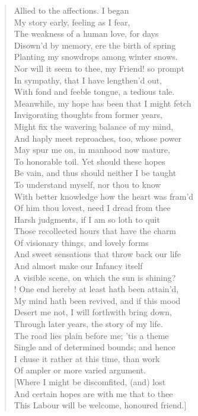 \begin{verse}
Allied to the affections. I began	  \\
My story early, feeling as I fear,  \\
The weakness of a human love, for days  \\
Disown'd by memory, ere the birth of spring  \\
Planting my snowdrops among winter snows.  \\
Nor will it seem to thee, my Friend! so prompt	  \\
In sympathy, that I have lengthen'd out,  \\
With fond and feeble tongue, a tedious tale.  \\
Meanwhile, my hope has been that I might fetch  \\
Invigorating thoughts from former years,  \\
Might fix the wavering balance of my mind,	  \\
And haply meet reproaches, too, whose power  \\
May spur me on, in manhood now mature,  \\
To honorable toil. Yet should these hopes  \\
Be vain, and thus should neither I be taught  \\
To understand myself, nor thou to know	  \\
With better knowledge how the heart was fram'd  \\
Of him thou lovest, need I dread from thee  \\
Harsh judgments, if I am so loth to quit  \\
Those recollected hours that have the charm  \\
Of visionary things, and lovely forms	  \\
And sweet sensations that throw back our life  \\
And almost make our Infancy itself  \\
A visible scene, on which the sun is shining?  \\!
One end hereby at least hath been attain'd,  \\
My mind hath been revived, and if this mood	  \\
Desert me not, I will forthwith bring down,  \\
Through later years, the story of my life.  \\
The road lies plain before me; 'tis a theme  \\
Single and of determined bounds; and hence  \\
I chuse it rather at this time, than work	  \\
Of ampler or more varied argument.  \\
{[}Where I might be discomfited, (and) lost  \\
And certain hopes are with me that to thee  \\
This Labour will be welcome, honoured friend.{]} \\
\end{verse}  %
